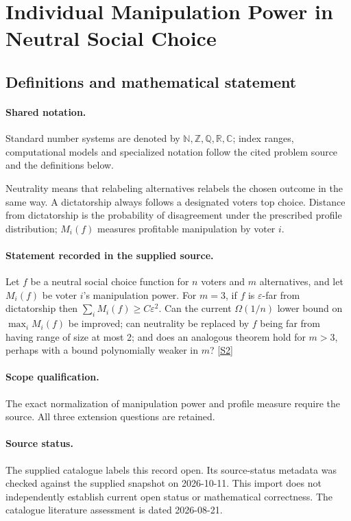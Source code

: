 \documentclass[11pt]{article}
\newcommand{\sref}[2]{\hyperlink{source:#1:#2}{[S#2]}}
\begin{document}
\section{Individual Manipulation Power in Neutral Social Choice}\label{statement}

\subsection{Definitions and mathematical statement}

\paragraph{Shared notation.}Standard number systems are denoted by $\mathbb N,\mathbb Z,\mathbb Q,\mathbb R,\mathbb C$; index ranges, computational models and specialized notation follow the cited problem source and the definitions below.


Neutrality means that relabeling alternatives relabels the chosen outcome in the same way. A dictatorship always follows a designated voter\textquotesingle s top choice. Distance from dictatorship is the probability of disagreement under the prescribed profile distribution; $M_i(f)$ measures profitable manipulation by voter $i$.
\paragraph{Statement recorded in the supplied source.}
Let $f$ be a neutral social choice function for $n$ voters and $m$ alternatives, and let $M_i(f)$ be voter $i$'s manipulation power. For $m=3$, if $f$ is $\varepsilon$-far from dictatorship then $\sum_iM_i(f)\geq C\varepsilon^2$. Can the current $\Omega(1/n)$ lower bound on $\max_iM_i(f)$ be improved; can neutrality be replaced by $f$ being far from having range of size at most 2; and does an analogous theorem hold for $m>3$, perhaps with a bound polynomially weaker in $m$? \sref{statement}{2}
\paragraph{Scope qualification.}
The exact normalization of manipulation power and profile measure require the source. All three extension questions are retained.
\paragraph{Source status.}
The supplied catalogue labels this record open. Its source-status metadata was checked against the supplied snapshot on 2026-10-11. This import does not independently establish current open status or mathematical correctness. The catalogue literature assessment is dated 2026-08-21.
\end{document}
